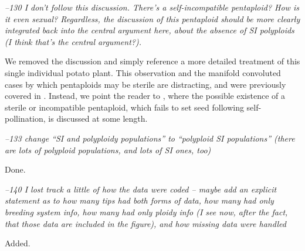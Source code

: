 \documentclass[11pt]{article}
\renewenvironment{quote}{\bigskip\noindent\itshape\ignorespaces}{\smallskip}
\begin{document}
\begin{quote}
--130 I don't follow this discussion.
There's a self-incompatible pentaploid?
How is it even sexual?
Regardless, the discussion of this pentaploid should be more clearly integrated back into the central argument here, about the absence of SI polyploids (I think that's the central argument?).
\end{quote}

We removed the discussion and simply reference a more detailed treatment of this single individual potato plant.
This observation \citet{camadro_1981} and the manifold convoluted cases by which pentaploids may be sterile are distracting, and were previously covered in \citep{robertson_2011}.
Instead, we point the reader to \citet{robertson_2011}, where the possible existence of a sterile or incompatible pentaploid, which fails to set seed following self-pollination, is discussed at some length.


\begin{quote}
--133 change ``SI and polyploidy populations'' to ``polyploid SI populations'' (there are lots of polyploid populations, and lots of SI ones, too)
\end{quote}

Done.


\begin{quote}
--140 I lost track a little of how the data were coded -- maybe add an explicit statement as to how many tips had both forms of data, how many had only breeding system info, how many had only ploidy info (I see now, after the fact, that those data are included in the figure), and how missing data were handled
\end{quote}

Added.
\end{document}

